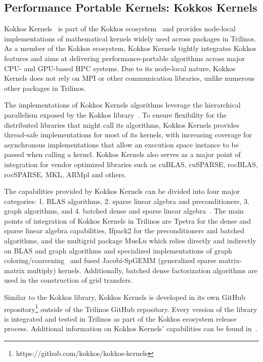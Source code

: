\subsection{Performance Portable Kernels: Kokkos Kernels}\label{subsec:kk}
Kokkos Kernels~\cite{rajamanickam2021kokkoskernels} is part of the Kokkos ecosystem~\cite{trott2021kokkos} and provides node-local implementations of mathematical kernels widely used across packages in Trilinos. As a member of the Kokkos ecosystem, Kokkos Kernels tightly integrates Kokkos features and aims at delivering performance\hyp{}portable algorithms across major CPU- and GPU-based HPC systems. Due to its node-local nature, Kokkos Kernels does not rely on MPI or other communication libraries, unlike numerous other packages in Trilinos.

The implementations of Kokkos Kernels algorithms leverage the hierarchical parallelism exposed by the Kokkos library~\cite{kim2017designing}. To ensure flexibility for the distributed libraries that might call its algorithms, Kokkos Kernels provides thread-safe implementations for most of its kernels, with increasing coverage for asynchronous implementations that allow an execution space instance to be passed when calling a kernel. Kokkos Kernels also serves as a major point of integration for vendor optimized libraries such as cuBLAS, cuSPARSE, rocBLAS, rocSPARSE, MKL, ARMpl and others.

The capabilities provided by Kokkos Kernels can be divided into four major categories:
1. BLAS algorithms, 2. sparse linear algebra and preconditioners, 3. graph algorithms, and
4. batched dense and sparse linear algebra~\cite{liegeois2023performance,10.1145/3431921}. The main
points of integration of Kokkos Kernels in Trilinos are Tpetra for the dense and sparse
linear algebra capabilities, Ifpack2 for the preconditioners and batched algorithms,
and the multigrid package MueLu which relies directly and indirectly on BLAS and graph algorithms and specialized implementations of graph coloring/coarsening~\cite{kelley2022parallel} and fused Jacobi-SpGEMM (generalized sparse matrix-matrix multiply) kernels.
Additionally, batched dense factorization algorithms are used in the construction of grid transfers.

Similar to the Kokkos library, Kokkos Kernels is developed in its own GitHub
repository\footnote{https://github.com/kokkos/kokkos-kernels} outside of the Trilinos
GitHub repository. Every version of the library is integrated and tested in Trilinos
as part of the Kokkos ecosystem release process. Additional information on Kokkos
Kernels' capabilities can be found in~\cite{deveci2018multithreaded,wolf2017fast}.

